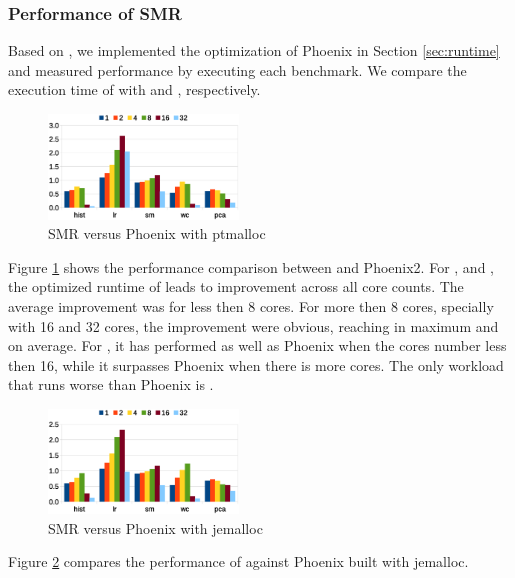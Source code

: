\subsubsection{Performance of SMR}
Based on \myth, we implemented the optimization of Phoenix in Section \ref{sec:runtime} and measured \myds performance by executing each benchmark. 
We compare the execution time of \myds with  and , respectively.
\begin{figure}[!h!t]  
	\centering
	\includegraphics[width=0.45\textwidth]{eps/dmr_time_array.eps}
	\caption{SMR versus Phoenix with ptmalloc}
	\label{fig:smr:time:ptmalloc}
\end{figure}


Figure \ref{fig:smr:time:ptmalloc} shows the performance comparison between \myds and Phoenix2.
For ,  and , the optimized runtime of \myds leads to improvement across all core counts.
The average improvement was  for less then 8 cores.
For more then 8 cores, specially with 16 and 32 cores, the improvement were obvious, reaching  in maximum and  on average.
For , it has performed as well as Phoenix when the cores number less then 16, while it surpasses Phoenix when there is more cores.
The only workload that \myds runs worse than Phoenix is .
\begin{figure}[!h!t]  
	\centering
	\includegraphics[width=0.45\textwidth]{eps/dmr_time_jemalloc.eps}
	\caption{SMR versus Phoenix with jemalloc}
	\label{fig:smr:time:jemalloc}
\end{figure}
Figure \ref{fig:smr:time:jemalloc} compares the performance of \myds against Phoenix built with jemalloc. 

